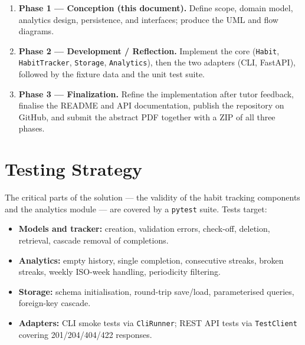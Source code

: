 \documentclass[11pt,a4paper]{article}
\begin{document}
\begin{enumerate}
  \item \textbf{Phase 1 — Conception (this document).} Define scope, domain
        model, analytics design, persistence, and interfaces; produce the UML
        and flow diagrams.
  \item \textbf{Phase 2 — Development / Reflection.} Implement the core
        (\texttt{Habit}, \texttt{HabitTracker}, \texttt{Storage},
        \texttt{Analytics}), then the two adapters (CLI, FastAPI), followed by
        the fixture data and the unit test suite.
  \item \textbf{Phase 3 — Finalization.} Refine the implementation after tutor
        feedback, finalise the README and API documentation, publish the
        repository on GitHub, and submit the abstract PDF together with a ZIP
        of all three phases.
\end{enumerate}

\medskip
\noindent


\section{Testing Strategy}

\noindent


The critical parts of the solution — the validity of the habit tracking
components and the analytics module — are covered by a \texttt{pytest} suite.
Tests target:

\begin{itemize}
  \item \textbf{Models and tracker:} creation, validation errors, check-off,
        deletion, retrieval, cascade removal of completions.
  \item \textbf{Analytics:} empty history, single completion, consecutive
        streaks, broken streaks, weekly ISO-week handling, periodicity
        filtering.
  \item \textbf{Storage:} schema initialisation, round-trip save/load,
        parameterised queries, foreign-key cascade.
  \item \textbf{Adapters:} CLI smoke tests via \texttt{CliRunner}; REST API
        tests via \texttt{TestClient} covering 201/204/404/422 responses.
\end{itemize}

\medskip
\noindent
\end{document}
